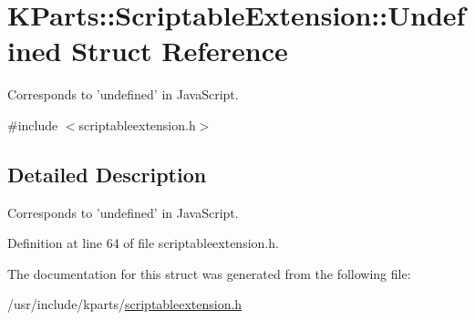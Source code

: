 \hypertarget{structKParts_1_1ScriptableExtension_1_1Undefined}{\section{K\+Parts\+:\+:Scriptable\+Extension\+:\+:Undefined Struct Reference}
\label{structKParts_1_1ScriptableExtension_1_1Undefined}
}


Corresponds to 'undefined' in Java\+Script.  




{\ttfamily \#include $<$scriptableextension.\+h$>$}



\subsection{Detailed Description}
Corresponds to 'undefined' in Java\+Script. 

Definition at line 64 of file scriptableextension.\+h.



The documentation for this struct was generated from the following file\+:\begin{DoxyCompactItemize}
\item 
/usr/include/kparts/\hyperlink{scriptableextension_8h}{scriptableextension.\+h}\end{DoxyCompactItemize}
